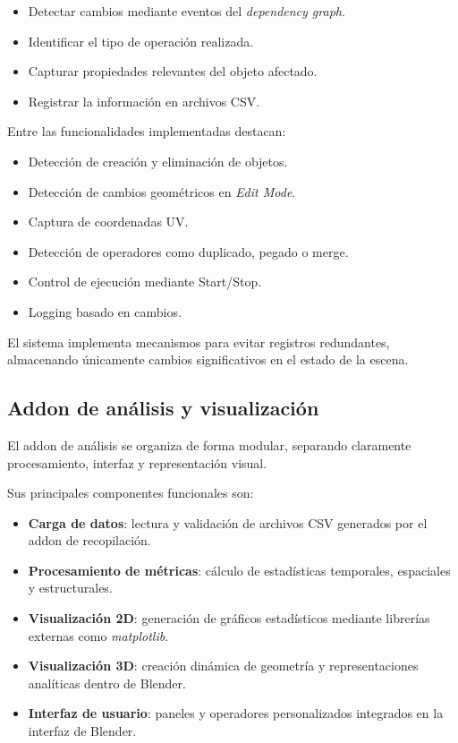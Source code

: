 \begin{itemize}
    \item Detectar cambios mediante eventos del \textit{dependency graph}.
    \item Identificar el tipo de operación realizada.
    \item Capturar propiedades relevantes del objeto afectado.
    \item Registrar la información en archivos CSV.
\end{itemize}

Entre las funcionalidades implementadas destacan:

\begin{itemize}
    \item Detección de creación y eliminación de objetos.
    \item Detección de cambios geométricos en \textit{Edit Mode}.
    \item Captura de coordenadas UV.
    \item Detección de operadores como duplicado, pegado o merge.
    \item Control de ejecución mediante Start/Stop.
    \item Logging basado en cambios.
\end{itemize}

El sistema implementa mecanismos para evitar registros redundantes, almacenando únicamente cambios significativos en el estado de la escena.

\subsection{Addon de análisis y visualización}

El addon de análisis se organiza de forma modular, separando claramente procesamiento, interfaz y representación visual.

Sus principales componentes funcionales son:

\begin{itemize}

    \item \textbf{Carga de datos}: lectura y validación de archivos CSV generados por el addon de recopilación.

    \item \textbf{Procesamiento de métricas}: cálculo de estadísticas temporales, espaciales y estructurales.

    \item \textbf{Visualización 2D}: generación de gráficos estadísticos mediante librerías externas como \textit{matplotlib}.

    \item \textbf{Visualización 3D}: creación dinámica de geometría y representaciones analíticas dentro de Blender.

    \item \textbf{Interfaz de usuario}: paneles y operadores personalizados integrados en la interfaz de Blender.

\end{itemize}

